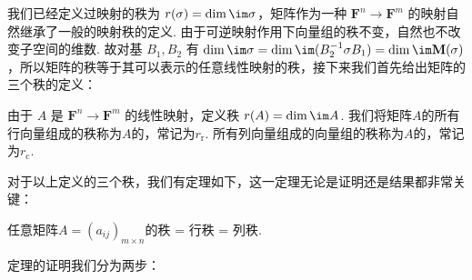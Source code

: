 我们已经定义过映射的秩为 $r(\sigma) = \dim \im \sigma$，矩阵作为一种 $\mathbf{F}^n \to \mathbf{F}^m$ 的映射自然继承了一般的映射秩的定义. 由于可逆映射作用下向量组的秩不变，自然也不改变子空间的维数. 故对基 $B_1, B_2$ 有 $\dim \im \sigma = \dim \im (B_2^{-1} \sigma B_1) = \dim \im \mathbf{M}(\sigma)$，所以矩阵的秩等于其可以表示的任意线性映射的秩，接下来我们首先给出矩阵的三个秩的定义：
\begin{definition}{}{}
    由于 $A$ 是 $\mathbf{F}^n\to\mathbf{F}^m$ 的线性映射，定义秩 $r(A) = \dim\im A$. 我们将矩阵$A$的所有行向量组成的秩称为$A$的，常记为$r_{\mathrm{r}}$. 所有列向量组成的向量组的秩称为$A$的，常记为$r_{\mathrm{c}}$.
\end{definition}
对于以上定义的三个秩，我们有定理如下，这一定理无论是证明还是结果都非常关键：
\begin{theorem}{}{}
    任意矩阵$A=(a_{ij})_{m\times n}$的秩 = 行秩 = 列秩.
\end{theorem}
定理的证明我们分为两步：

